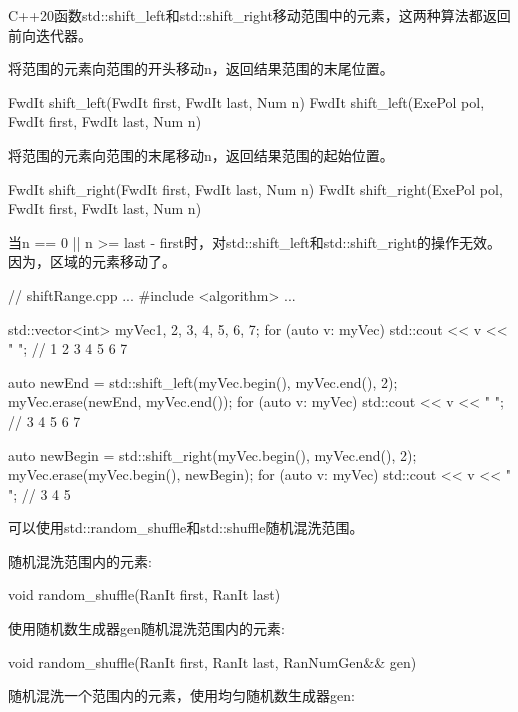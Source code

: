 
C++20函数std::shift\_left和std::shift\_right移动范围中的元素，这两种算法都返回前向迭代器。

将范围的元素向范围的开头移动n，返回结果范围的末尾位置。

\begin{cpp}
FwdIt shift_left(FwdIt first, FwdIt last, Num n)
FwdIt shift_left(ExePol pol, FwdIt first, FwdIt last, Num n)
\end{cpp}

将范围的元素向范围的末尾移动n，返回结果范围的起始位置。

\begin{cpp}
FwdIt shift_right(FwdIt first, FwdIt last, Num n)
FwdIt shift_right(ExePol pol, FwdIt first, FwdIt last, Num n)
\end{cpp}

当n == 0 || n >= last - first时，对std::shift\_left和std::shift\_right的操作无效。因为，区域的元素移动了。


\begin{cpp}
// shiftRange.cpp
...
#include <algorithm>
...

std::vector<int> myVec{1, 2, 3, 4, 5, 6, 7};
for (auto v: myVec) std::cout << v << " "; // 1 2 3 4 5 6 7

auto newEnd = std::shift_left(myVec.begin(), myVec.end(), 2);
myVec.erase(newEnd, myVec.end());
for (auto v: myVec) std::cout << v << " "; // 3 4 5 6 7

auto newBegin = std::shift_right(myVec.begin(), myVec.end(), 2);
myVec.erase(myVec.begin(), newBegin);
for (auto v: myVec) std::cout << v << " "; // 3 4 5
\end{cpp}


可以使用std::random\_shuffle和std::shuffle随机混洗范围。

随机混洗范围内的元素:

\begin{cpp}
void random_shuffle(RanIt first, RanIt last)
\end{cpp}

使用随机数生成器gen随机混洗范围内的元素:

\begin{cpp}
void random_shuffle(RanIt first, RanIt last, RanNumGen&& gen)
\end{cpp}

随机混洗一个范围内的元素，使用均匀随机数生成器gen:

